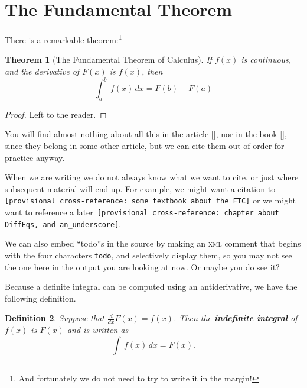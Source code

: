 \documentclass{sn-jnl}
\theoremstyle{thmstyleone}%
\newtheorem{theorem}{Theorem}[section]
\theoremstyle{thmstyletwo}%
\newtheorem{definition}[theorem]{Definition}
\theoremstyle{thmstylethree}%
\newcommand{\xreffont}{\relax}
\newcommand{\mono}[1]{\texttt{#1}}
\newcommand{\initialism}[1]{\textsc{\MakeLowercase{#1}}}
\newcommand{\terminology}[1]{\textbf{#1}}
\numberwithin{equation}{section}
\newcommand{\definiteintegral}[4]{\int_{#1}^{#2}\,#3\,d#4}
\begin{document}
\section{The Fundamental Theorem}\label{section-fundamental-theorem}%
There is a remarkable theorem:\footnote{And fortunately we do not need to try to write it in the margin!\label{footnote-fermat}}%
\begin{theorem}[The Fundamental Theorem of Calculus]\label{theorem-FTC}%
%
%
If \(f(x)\) is continuous, and the derivative of \(F(x)\) is \(f(x)\), then%
\begin{equation*}
\definiteintegral{a}{b}{f(x)}{x}=F(b)-F(a)
\end{equation*}
%
\end{theorem}
\begin{proof}\label{theorem-FTC-4}%
Left to the reader.%
\end{proof}
You will find almost nothing about all this in the article \hyperlink{biblio-lay-article}{[{\xreffont 2}]}, nor in the book \hyperlink{biblio-judson-AATA}{[{\xreffont 1}]}, since they belong in some other article, but we can cite them out-of-order for practice anyway.%
\par
When we are writing we do not always know what we want to cite, or just where subsequent material will end up.  For example, we might want a citation to \mono{[provisional cross-reference: some textbook about the FTC]} or we might want to reference a later~\mono{[provisional cross-reference: chapter about DiffEq\textquotesingle{}s, and an\_underscore]}.%
\par
We can also embed ``todo''s in the source by making an \initialism{XML} comment that begins with the four characters \mono{todo}, and selectively display them, so you may not see the one here in the output you are looking at now.  Or maybe you do see it?%
\par
Because a definite integral can be computed using an antiderivative, we have the following definition.%
\begin{definition}\label{definition-indefinite-integral}%
%
%
%
\label{definition-indefinite-integral-3}%
Suppose that \(\frac{d}{dx}F(x)=f(x)\).  Then the \terminology{indefinite integral} of \(f(x)\) is \(F(x)\) and is written as%
\begin{equation*}
\int\,f(x)\,dx=F(x)\text{.}
\end{equation*}
%
\end{definition}
%
%
\typeout{************************************************}
\typeout{************************************************}
%
\end{document}
